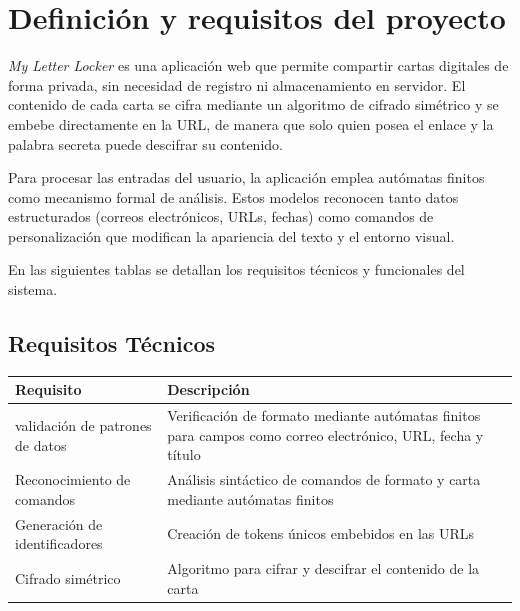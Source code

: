 \documentclass[12pt,letterpaper]{article}
\begin{document}
\section{Definición y requisitos del proyecto}
\emph{My Letter Locker} es una aplicación web que permite compartir cartas digitales de forma privada, sin necesidad de registro ni almacenamiento en servidor. El contenido de cada carta se cifra mediante un algoritmo de cifrado simétrico y se embebe directamente en la URL, de manera que solo quien posea el enlace y la palabra secreta puede descifrar su contenido.

Para procesar las entradas del usuario, la aplicación emplea autómatas finitos como mecanismo formal de análisis. Estos modelos reconocen tanto datos estructurados (correos electrónicos, URLs, fechas) como comandos de personalización que modifican la apariencia del texto y el entorno visual.

En las siguientes tablas se detallan los requisitos técnicos y funcionales del sistema.

\subsection{Requisitos Técnicos}

\begin{table}[H]
	\centering
	\begin{tabularx}{\textwidth}{p{3.5cm}X}
		\toprule
		\textbf{Requisito}              & \textbf{Descripción}                                                                                            \\
		\midrule
		validación de patrones de datos & Verificación de formato mediante autómatas finitos para campos como correo electrónico, URL, fecha y título \\
		\addlinespace[0.6cm]
		Reconocimiento de comandos      & Análisis sintáctico de comandos de formato y carta mediante autómatas finitos                                   \\
		\addlinespace[0.6cm]
		Generación de identificadores   & Creación de tokens únicos embebidos en las URLs                                                                 \\
		\addlinespace[0.6cm]
		Cifrado simétrico               & Algoritmo para cifrar y descifrar el contenido de la carta                                                      \\
		\bottomrule
	\end{tabularx}
\end{table}
\end{document}
